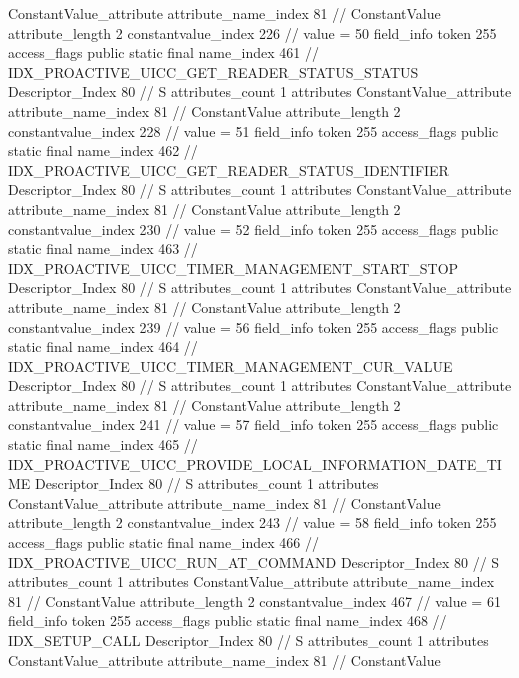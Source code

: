{{{{{{				ConstantValue_attribute {
					attribute_name_index	81		// ConstantValue
					attribute_length	2
					constantvalue_index	226		// value = 50
				}
				}
			}
			field_info {
				token	255
				access_flags	public static final
				name_index	461		// IDX_PROACTIVE_UICC_GET_READER_STATUS_STATUS
				Descriptor_Index	80		// S
				attributes_count	1
				attributes {
				ConstantValue_attribute {
					attribute_name_index	81		// ConstantValue
					attribute_length	2
					constantvalue_index	228		// value = 51
				}
				}
			}
			field_info {
				token	255
				access_flags	public static final
				name_index	462		// IDX_PROACTIVE_UICC_GET_READER_STATUS_IDENTIFIER
				Descriptor_Index	80		// S
				attributes_count	1
				attributes {
				ConstantValue_attribute {
					attribute_name_index	81		// ConstantValue
					attribute_length	2
					constantvalue_index	230		// value = 52
				}
				}
			}
			field_info {
				token	255
				access_flags	public static final
				name_index	463		// IDX_PROACTIVE_UICC_TIMER_MANAGEMENT_START_STOP
				Descriptor_Index	80		// S
				attributes_count	1
				attributes {
				ConstantValue_attribute {
					attribute_name_index	81		// ConstantValue
					attribute_length	2
					constantvalue_index	239		// value = 56
				}
				}
			}
			field_info {
				token	255
				access_flags	public static final
				name_index	464		// IDX_PROACTIVE_UICC_TIMER_MANAGEMENT_CUR_VALUE
				Descriptor_Index	80		// S
				attributes_count	1
				attributes {
				ConstantValue_attribute {
					attribute_name_index	81		// ConstantValue
					attribute_length	2
					constantvalue_index	241		// value = 57
				}
				}
			}
			field_info {
				token	255
				access_flags	public static final
				name_index	465		// IDX_PROACTIVE_UICC_PROVIDE_LOCAL_INFORMATION_DATE_TIME
				Descriptor_Index	80		// S
				attributes_count	1
				attributes {
				ConstantValue_attribute {
					attribute_name_index	81		// ConstantValue
					attribute_length	2
					constantvalue_index	243		// value = 58
				}
				}
			}
			field_info {
				token	255
				access_flags	public static final
				name_index	466		// IDX_PROACTIVE_UICC_RUN_AT_COMMAND
				Descriptor_Index	80		// S
				attributes_count	1
				attributes {
				ConstantValue_attribute {
					attribute_name_index	81		// ConstantValue
					attribute_length	2
					constantvalue_index	467		// value = 61
				}
				}
			}
			field_info {
				token	255
				access_flags	public static final
				name_index	468		// IDX_SETUP_CALL
				Descriptor_Index	80		// S
				attributes_count	1
				attributes {
				ConstantValue_attribute {
					attribute_name_index	81		// ConstantValue
}}}}}}}
